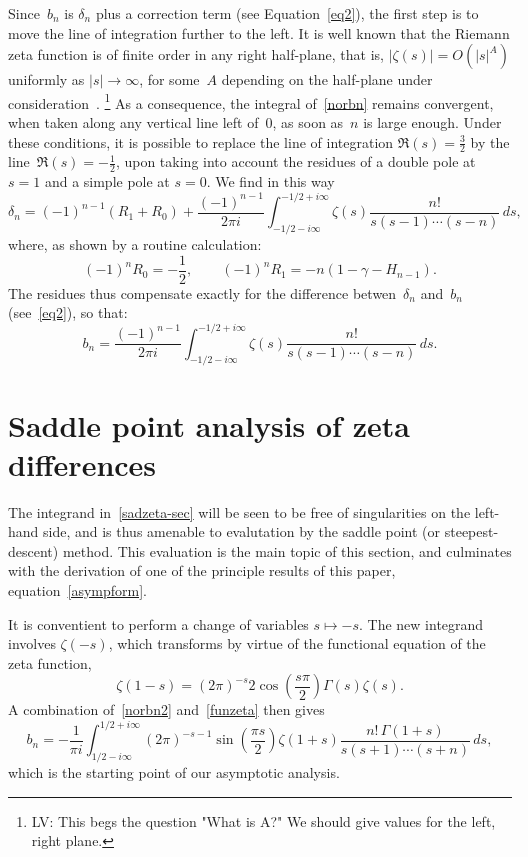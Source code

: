 \documentclass{amsart}
\begin{document}
Since~$b_n$ is $\delta_n$ plus a correction term (see Equation~\eqref{eq2}),
the first step is to move the line of integration further to the left.
It is well known that the Riemann zeta function is of finite order in any right half-plane,
that is, $|\zeta(s)|=O(|s|^A)$ uniformly as $|s|\to\infty$, for some~$A$ depending on the
half-plane under consideration~\cite{Titchmarsh86}.
\footnote{
LV: This begs the question "What is A?" We should give values for the left, right plane.
}
As a consequence, the integral of~\eqref{norbn} remains 
convergent, when taken along any vertical line left of~0,
as soon as~$n$ is large enough. Under these conditions, it is possible
to replace the line of integration $\Re(s)=\frac32$ by the line~$\Re(s)=-\frac12$, upon
taking into account the residues of a double pole at $s=1$ and a simple
pole at $s=0$.
We find in this way
\[
\delta_n=(-1)^{n-1} (R_1+R_0)+\frac{(-1)^{n-1}}{2\pi i}\int_{-1/2-i\infty}^{-1/2+i\infty} 
\zeta(s) \frac{n!}{s(s-1)\cdots(s-n)}\, ds, \]
where, as shown by a routine calculation:
\[
(-1)^n R_0=-\frac12,
\qquad
(-1)^nR_1=-n(1-\gamma-H_{n-1}).
\]
The residues thus compensate exactly 
for the difference betwen~$\delta_n$ and~$b_n$ (see~\eqref{eq2}), so that:
\begin{equation}\label{norbn2}
b_n=
\frac{(-1)^{n-1}}{2\pi i}\int_{-1/2-i\infty}^{-1/2+i\infty} 
\zeta(s) \frac{n!}{s(s-1)\cdots(s-n)}\, ds.
\end{equation}

\section{Saddle point analysis of zeta differences}\label{sadzeta-sec}

The integrand in~\eqref{sadzeta-sec} will be seen to be free of 
singularities on the left-hand side, and is thus amenable to evalutation
by the saddle point (or steepest-descent) method.  This evaluation 
is the main topic of this section, and culminates with the derivation of
one of the principle results of this paper, equation~\eqref{asympform}.

It is conventient to perform a change of variables $s\mapsto -s$.
The new integrand involves $\zeta(-s)$, which transforms by virtue of the 
functional equation 
of the zeta function,
\begin{equation}\label{funzeta}
\zeta(1-s)=(2\pi)^{-s}2\cos\left(\frac{s\pi}{2}\right)\Gamma(s)\zeta(s).
\end{equation}
A combination of~\eqref{norbn2} and~\eqref{funzeta} then gives
\begin{equation}\label{mainint}
b_n = -\frac{1}{\pi i} 
\int_{1/2-i\infty}^{1/2+i\infty} 
(2\pi)^{-s-1} \sin\left(\frac{\pi s}{2}\right)\zeta(1+s)
\frac{n!\,\Gamma(1+s)}{s(s+1)\cdots(s+n)}\, ds,
\end{equation}
which is the starting point of our asymptotic analysis.
\end{document}
